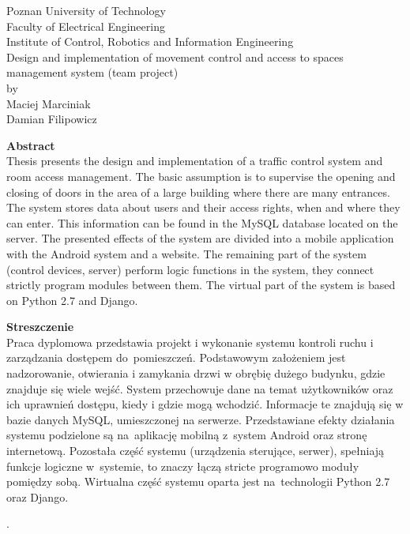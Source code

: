\documentclass[twoside,10pt]{article}
\def\TytulAngielski {Design and implementation of movement control and access to spaces management system (team project)}
\def\StudentA     {Maciej Marciniak}
\def\StudentB     {Damian Filipowicz}
\begin{document}
\newpage
\setcounter{page}{3}
\thispagestyle{empty}
\begin{center}
Poznan University of Technology\\
Faculty of Electrical Engineering\\
Institute of Control, Robotics and Information Engineering\\
\vspace{20mm}
\huge{\TytulAngielski} \\
\Large{by}\\
\vspace{5mm}
\Large{\StudentA}\\
\Large{\StudentB}\\
\vspace{20mm}

\normalsize\textbf{Abstract} \\
{Thesis presents the design and implementation of a traffic control system and room access management. \linebreak The basic assumption is to supervise the opening and closing of doors in the area of a large building where there are many entrances. The system stores data about users and their access rights, when and where they can enter. This information can be found in the MySQL database located on the server. The presented effects of the system are divided into a mobile application with the Android system and a website. The remaining part of the system (control devices, server) perform logic functions in the system, they connect strictly program modules between them. The virtual part of the system is based on Python 2.7 and Django.} 

\end{center}

\begin{center}
\textbf{Streszczenie} \\
{Praca dyplomowa przedstawia projekt i wykonanie systemu kontroli ruchu i zarządzania dostępem do~pomieszczeń. Podstawowym założeniem jest nadzorowanie, otwierania i zamykania drzwi w obrębię dużego budynku, gdzie znajduje się wiele wejść. System przechowuje dane na temat użytkowników oraz ich uprawnień dostępu, kiedy i gdzie mogą wchodzić. Informacje te znajdują się w bazie danych MySQL, umieszczonej na serwerze. Przedstawiane efekty działania systemu podzielone są na~aplikację mobilną z~system Android oraz stronę internetową. Pozostała część systemu (urządzenia sterujące, serwer), spełniają funkcje logiczne w~systemie, to znaczy łączą stricte programowo moduły pomiędzy sobą. Wirtualna część systemu oparta jest na~technologii Python 2.7 oraz Django.} 
\end{center}
\newpage
\thispagestyle{empty}
{\tiny .}
\end{document}

